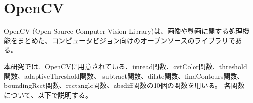 
\section{OpenCV}\label{sec:opencv}
OpenCV (Open Source Computer Vision Library)\cite{OpenCV}は、画像や動画に関する処理機能をまとめた、コンピュータビジョン向けのオープンソースのライブラリである。
\par
本研究では、OpenCVに用意されている、imread関数、cvtColor関数、threshold関数、adaptiveThreshold関数、
subtract関数、dilate関数、findContours関数、boundingRect関数、rectangle関数、absdiff関数の10個の関数を用いる。
各関数について、以下で説明する。

